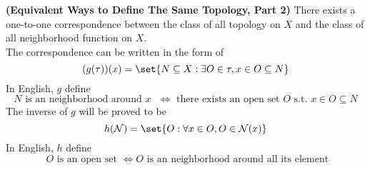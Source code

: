 \documentclass{report}
\begin{document}
\begin{theorem}
\label{2.1.5}
\textbf{(Equivalent Ways to Define The Same Topology, Part 2)} There exists a one-to-one correspondence between the class of all topology on $X$ and the class of all neighborhood function on $X$.\\

The correspondence can be written in the form of 
\begin{equation*} (g(\tau))(x)=\set{N\subseteq X: \exists O\in \tau,x\in O\subseteq N}
\end{equation*}
In English, $g$ define
\begin{equation*}
N\text{ is an neighborhood around $x$ }\iff \text{ there exists an open set $O$ s.t. }x\in O\subseteq N
\end{equation*}
The inverse of $g$ will be proved to be
\begin{equation*}
   h(\mathcal{N})=\set{O:\forall x \in O, O\in \mathcal{N}(x)}
\end{equation*}
In English, $h$ define
\begin{equation*}
\text{ $O$ is an open set }\iff O \text{ is an neighborhood around all its element }
\end{equation*}
\end{theorem}
\end{document}
